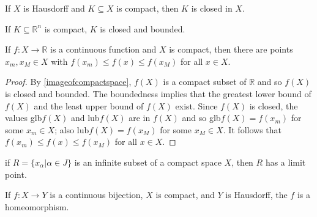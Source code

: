 \begin{proposition}
If $X$ is Hausdorff and $K \subseteq X$ is compact, then $K$ is closed in $X$.
\end{proposition}

\begin{corollary}
If $K \subseteq \mathbb{R}^n$ is compact, $K$ is closed and bounded.
\end{corollary}

\begin{theorem}
\label{extremevaluetheorem}
If $f: X \rightarrow \mathbb{R}$ is a continuous function and $X$ is compact, then there are points $x_m, x_M \in X$ with $f(x_m) \leq f(x) \leq f(x_M)$ for all $x \in X$.
\end{theorem}

\begin{proof}
By \ref{imageofcompactspace}, $f(X)$ is a compact subset of $\mathbb{R}$ and so $f(X)$ is closed and bounded. The boundedness implies that the greatest lower bound of $f(X)$ and the least upper bound of $f(X)$ exist.
Since $f(X)$ is closed, the values glb$f(X)$ and lub$f(X)$ are in $f(X)$ and so glb$f(X) = f(x_m)$ for some $x_m \in X$; also lub$f(X) = f(x_M)$ for some $x_M \in X$. It follows that $f(x_m) \leq f(x) \leq f(x_M)$ for all
$x \in X$.
\end{proof}

\begin{proposition}
if $R = \{ x_{\alpha} | \alpha \in J \}$ is an infinite subset of a compact space $X$, then $R$ has a limit point.
\end{proposition}

\begin{proposition}
\label{gtet}
If $f: X \rightarrow Y$ is a continuous bijection, $X$ is compact, and $Y$ is Hausdorff, the $f$ is a homeomorphism. 
\end{proposition}

